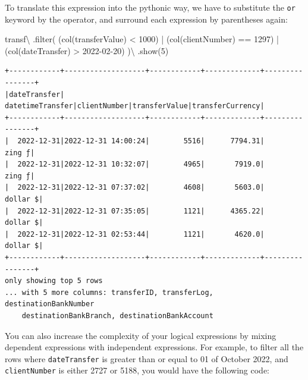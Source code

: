 \documentclass[
  11pt,
  letterpaper,
  DIV=11,
  numbers=noendperiod]{scrreprt}
\newenvironment{Shaded}{\begin{snugshade}}{\end{snugshade}}
\newcommand{\BuiltInTok}[1]{\textcolor[rgb]{0.00,0.23,0.31}{#1}}
\newcommand{\DecValTok}[1]{\textcolor[rgb]{0.68,0.00,0.00}{#1}}
\newcommand{\NormalTok}[1]{\textcolor[rgb]{0.00,0.23,0.31}{#1}}
\newcommand{\OperatorTok}[1]{\textcolor[rgb]{0.37,0.37,0.37}{#1}}
\newcommand{\StringTok}[1]{\textcolor[rgb]{0.13,0.47,0.30}{#1}}
\begin{document}
To translate this expression into the pythonic way, we have to
substitute the \texttt{or} keyword by the \texttt{\textbar{}} operator,
and surround each expression by parentheses again:

\begin{Shaded}
\begin{Highlighting}[]
\NormalTok{transf}\OperatorTok{\textbackslash{}}
\NormalTok{  .}\BuiltInTok{filter}\NormalTok{(}
\NormalTok{    (col(}\StringTok{\textquotesingle{}transferValue\textquotesingle{}}\NormalTok{) }\OperatorTok{\textless{}} \DecValTok{1000}\NormalTok{) }\OperatorTok{|}
\NormalTok{    (col(}\StringTok{\textquotesingle{}clientNumber\textquotesingle{}}\NormalTok{) }\OperatorTok{==} \DecValTok{1297}\NormalTok{) }\OperatorTok{|}
\NormalTok{    (col(}\StringTok{\textquotesingle{}dateTransfer\textquotesingle{}}\NormalTok{) }\OperatorTok{\textgreater{}} \StringTok{\textquotesingle{}2022{-}02{-}20\textquotesingle{}}\NormalTok{)}
\NormalTok{  )}\OperatorTok{\textbackslash{}}
\NormalTok{  .show(}\DecValTok{5}\NormalTok{)}
\end{Highlighting}
\end{Shaded}

\begin{verbatim}
+------------+-------------------+------------+-------------+----------------+
|dateTransfer|   datetimeTransfer|clientNumber|transferValue|transferCurrency|
+------------+-------------------+------------+-------------+----------------+
|  2022-12-31|2022-12-31 14:00:24|        5516|      7794.31|          zing ƒ|
|  2022-12-31|2022-12-31 10:32:07|        4965|       7919.0|          zing ƒ|
|  2022-12-31|2022-12-31 07:37:02|        4608|       5603.0|        dollar $|
|  2022-12-31|2022-12-31 07:35:05|        1121|      4365.22|        dollar $|
|  2022-12-31|2022-12-31 02:53:44|        1121|       4620.0|        dollar $|
+------------+-------------------+------------+-------------+----------------+
only showing top 5 rows
... with 5 more columns: transferID, transferLog, destinationBankNumber
    destinationBankBranch, destinationBankAccount
\end{verbatim}

You can also increase the complexity of your logical expressions by
mixing dependent expressions with independent expressions. For example,
to filter all the rows where \texttt{dateTransfer} is greater than or
equal to 01 of October 2022, and \texttt{clientNumber} is either 2727 or
5188, you would have the following code:
\end{document}

